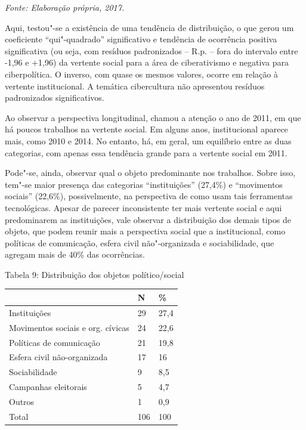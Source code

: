 \begin{center}
{\footnotesize\emph{Fonte: Elaboração própria, 2017.}}
\end{center}

Aqui, testou"-se a existência de uma tendência de distribuição, o que
gerou um coeficiente ``qui"-quadrado'' significativo e tendência de
ocorrência positiva significativa (ou seja, com resíduos padronizados --
R.p. -- fora do intervalo entre -1,96 e +1,96) da vertente social para a
área de ciberativismo e negativa para ciberpolítica. O inverso, com
quase os mesmos valores, ocorre em relação à vertente institucional. A
temática cibercultura não apresentou resíduos padronizados
significativos.

Ao observar a perspectiva longitudinal, chamou a atenção o ano de 2011,
em que há poucos trabalhos na vertente social. Em alguns anos,
institucional aparece mais, como 2010 e 2014. No entanto, há, em geral,
um equilíbrio entre as duas categorias, com apenas essa tendência grande
para a vertente social em 2011.

Pode"-se, ainda, observar qual o objeto predominante nos trabalhos. Sobre
isso, tem"-se maior presença das categorias ``instituições'' (27,4\%) e
``movimentos sociais'' (22,6\%), possivelmente, na perspectiva de como
usam tais ferramentas tecnológicas. Apesar de parecer inconsistente ter
mais vertente social e aqui predominarem as instituições, vale observar
a distribuição dos demais tipos de objeto, que podem reunir mais a
perspectiva social que a institucional, como políticas de comunicação,
esfera civil não"-organizada e sociabilidade, que agregam mais de 40\%
das ocorrências.

\begin{center}
Tabela 9: Distribuição dos objetos político/social
\end{center}

\begin{center}
\centering
\begin{tabular}{|l|l|l|}
\hline
 & \textbf{N} & \textbf{\%} \\ \hline
Instituições & 29 & 27,4 \\ \hline
Movimentos sociais e org. cívicas & 24 & 22,6 \\ \hline
Políticas de comunicação & 21 & 19,8 \\ \hline
Esfera civil não-organizada & 17 & 16 \\ \hline
Sociabilidade & 9 & 8,5 \\ \hline
Campanhas eleitorais & 5 & 4,7 \\ \hline
Outros & 1 & 0,9 \\ \hline
Total & 106 & 100 \\ \hline
\end{tabular}
\end{center}

